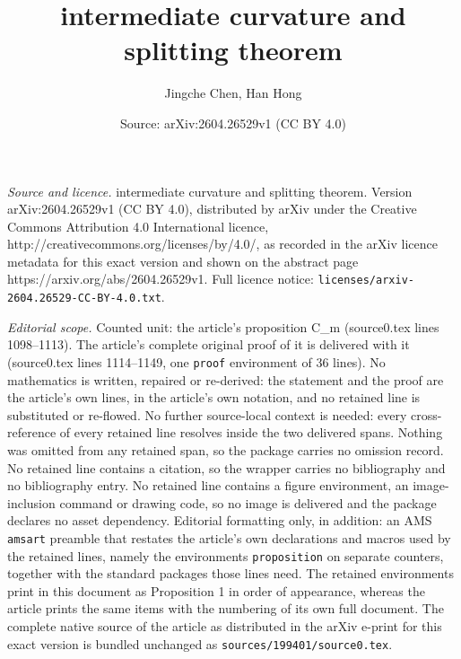 \documentclass[10pt,a4paper]{amsart}
\title{intermediate curvature and splitting theorem}
\author{Jingche Chen, Han Hong}
\date{Source: arXiv:2604.26529v1 (CC BY 4.0)}
\begin{document}
\maketitle

\noindent\emph{Source and licence.} intermediate curvature and splitting theorem. Version arXiv:2604.26529v1 (CC BY 4.0), distributed by arXiv under the Creative Commons Attribution 4.0 International licence, http://creativecommons.org/licenses/by/4.0/, as recorded in the arXiv licence metadata for this exact version and shown on the abstract page https://arxiv.org/abs/2604.26529v1. Full licence notice: \texttt{licenses/arxiv-2604.26529-CC-BY-4.0.txt}.\par\smallskip

\noindent\textit{Editorial scope.} Counted unit: the article's proposition C\_m (source0.tex lines 1098--1113). The article's complete original proof of it is delivered with it (source0.tex lines 1114--1149, one \texttt{proof} environment of 36 lines). No mathematics is written, repaired or re-derived: the statement and the proof are the article's own lines, in the article's own notation, and no retained line is substituted or re-flowed.  No further source-local context is needed: every cross-reference of every retained line resolves inside the two delivered spans.  Nothing was omitted from any retained span, so the package carries no omission record.  No retained line contains a citation, so the wrapper carries no bibliography and no bibliography entry.  No retained line contains a figure environment, an image-inclusion command or drawing code, so no image is delivered and the package declares no asset dependency.  Editorial formatting only, in addition: an AMS \texttt{amsart} preamble that restates the article's own declarations and macros used by the retained lines, namely the environments \texttt{proposition} on separate counters, together with the standard packages those lines need.  The retained environments print in this document as Proposition 1 in order of appearance, whereas the article prints the same items with the numbering of its own full document.  The complete native source of the article as distributed in the arXiv e-print for this exact version is bundled unchanged as \texttt{sources/199401/source0.tex}.
\end{document}

